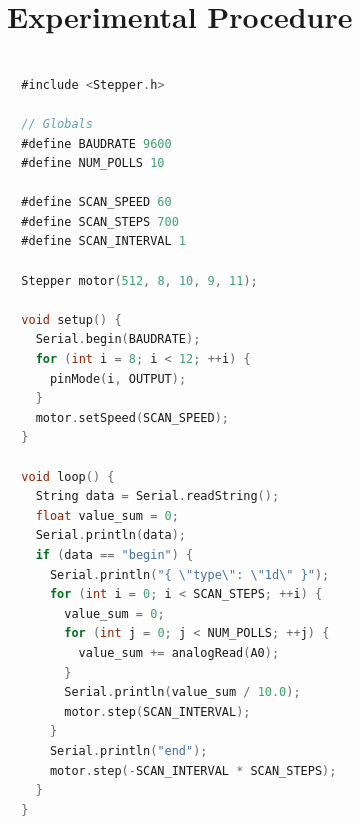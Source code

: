 \documentclass[letterpaper, 12pt]{article}
\begin{document}
\section{Experimental Procedure}


\begin{lstlisting}[language=C,showstringspaces=false]

  #include <Stepper.h>

  // Globals
  #define BAUDRATE 9600
  #define NUM_POLLS 10

  #define SCAN_SPEED 60
  #define SCAN_STEPS 700
  #define SCAN_INTERVAL 1

  Stepper motor(512, 8, 10, 9, 11);

  void setup() {
    Serial.begin(BAUDRATE);
    for (int i = 8; i < 12; ++i) {
      pinMode(i, OUTPUT);
    }
    motor.setSpeed(SCAN_SPEED);
  }

  void loop() {
    String data = Serial.readString();
    float value_sum = 0;
    Serial.println(data);
    if (data == "begin") {
      Serial.println("{ \"type\": \"1d\" }");
      for (int i = 0; i < SCAN_STEPS; ++i) {
        value_sum = 0;
        for (int j = 0; j < NUM_POLLS; ++j) {
          value_sum += analogRead(A0);
        }
        Serial.println(value_sum / 10.0);
        motor.step(SCAN_INTERVAL);
      }
      Serial.println("end");
      motor.step(-SCAN_INTERVAL * SCAN_STEPS);
    }
  }
\end{lstlisting}
\end{document}
